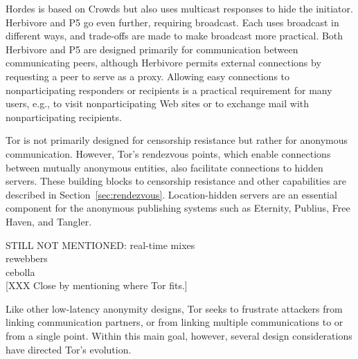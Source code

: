 \documentclass[times,10pt,twocolumn]{article}
\begin{document}
Hordes \cite{hordes-jcs} is based on Crowds but also uses multicast
responses to hide the initiator. Herbivore \cite{herbivore} and
P5 \cite{p5} go even further, requiring broadcast.
Each uses broadcast in different ways, and trade-offs are made to
make broadcast more practical. Both Herbivore and P5 are designed primarily
for communication between communicating peers, although Herbivore
permits external connections by requesting a peer to serve as a proxy.
Allowing easy connections to nonparticipating responders or recipients
is a practical requirement for many users, e.g., to visit
nonparticipating Web sites or to exchange mail with nonparticipating
recipients.

Tor is not primarily designed for censorship resistance but rather
for anonymous communication. However, Tor's rendezvous points, which
enable connections between mutually anonymous entities, also
facilitate connections to hidden servers.  These building blocks to
censorship resistance and other capabilities are described in
Section~\ref{sec:rendezvous}.  Location-hidden servers are an
essential component for the anonymous publishing systems such as
Eternity\cite{eternity}, Publius\cite{publius},
Free Haven\cite{freehaven-berk}, and Tangler\cite{tangler}.


STILL NOT MENTIONED:
real-time mixes\\
rewebbers\\
cebolla\\


[XXX Close by mentioning where Tor fits.]

\label{sec:assumptions}

Like other low-latency anonymity designs, Tor seeks to frustrate
attackers from linking communication partners, or from linking
multiple communications to or from a single point.  Within this
main goal, however, several design considerations have directed
Tor's evolution.
\end{document}
